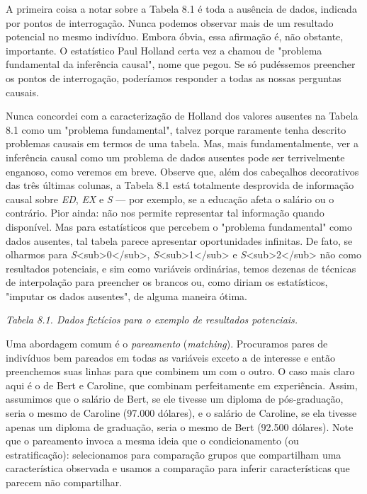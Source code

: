 \documentclass[11pt,a5paper,twoside]{book}
\begin{document}
A primeira coisa a notar sobre a Tabela 8.1 é toda a ausência de dados, indicada por pontos de interrogação. Nunca podemos observar mais de um resultado potencial no mesmo indivíduo. Embora óbvia, essa afirmação é, não obstante, importante. O estatístico Paul Holland certa vez a chamou de "problema fundamental da inferência causal", nome que pegou. Se só pudéssemos preencher os pontos de interrogação, poderíamos responder a todas as nossas perguntas causais.

Nunca concordei com a caracterização de Holland dos valores ausentes na Tabela 8.1 como um "problema fundamental", talvez porque raramente tenha descrito problemas causais em termos de uma tabela. Mas, mais fundamentalmente, ver a inferência causal como um problema de dados ausentes pode ser terrivelmente enganoso, como veremos em breve. Observe que, além dos cabeçalhos decorativos das três últimas colunas, a Tabela 8.1 está totalmente desprovida de informação causal sobre \textit{ED}, \textit{EX} e \textit{S} — por exemplo, se a educação afeta o salário ou o contrário. Pior ainda: não nos permite representar tal informação quando disponível. Mas para estatísticos que percebem o "problema fundamental" como dados ausentes, tal tabela parece apresentar oportunidades infinitas. De fato, se olharmos para \textit{S}<sub>0</sub>, \textit{S}<sub>1</sub> e \textit{S}<sub>2</sub> não como resultados potenciais, e sim como variáveis ordinárias, temos dezenas de técnicas de interpolação para preencher os brancos ou, como diriam os estatísticos, "imputar os dados ausentes", de alguma maneira ótima.

\textit{Tabela 8.1. Dados fictícios para o exemplo de resultados potenciais.}

Uma abordagem comum é o \textit{pareamento} (\textit{matching}). Procuramos pares de indivíduos bem pareados em todas as variáveis exceto a de interesse e então preenchemos suas linhas para que combinem um com o outro. O caso mais claro aqui é o de Bert e Caroline, que combinam perfeitamente em experiência. Assim, assumimos que o salário de Bert, se ele tivesse um diploma de pós-graduação, seria o mesmo de Caroline (97.000 dólares), e o salário de Caroline, se ela tivesse apenas um diploma de graduação, seria o mesmo de Bert (92.500 dólares). Note que o pareamento invoca a mesma ideia que o condicionamento (ou estratificação): selecionamos para comparação grupos que compartilham uma característica observada e usamos a comparação para inferir características que parecem não compartilhar.
\end{document}
